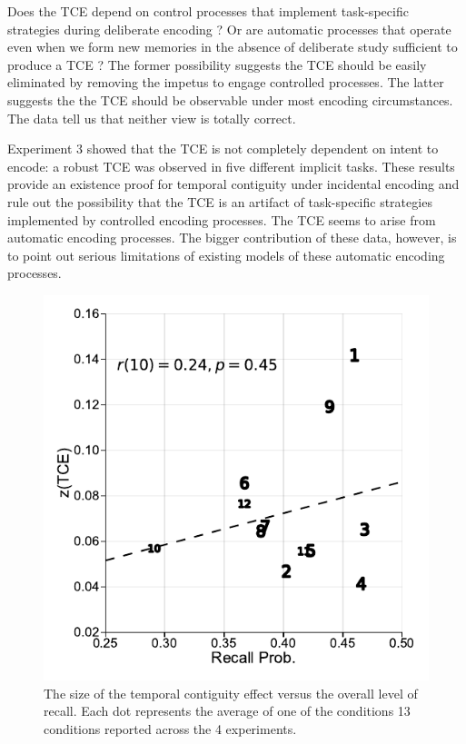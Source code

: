 \documentclass[man,natbib,floatsintext]{apa6} %
\begin{document}
\color{black}
Does the TCE depend on control processes that implement task-specific strategies during deliberate encoding \citep{Hint16}? Or are automatic processes that operate even when we form new memories in the absence of deliberate study sufficient to produce a TCE \citep{HealKaha17}? The former possibility suggests the TCE should be easily eliminated by removing the impetus to engage controlled processes. The latter suggests the the TCE should be observable under most encoding circumstances. The data tell us that neither view is totally correct.

Experiment 3 showed that the TCE is not completely dependent on intent to encode: a robust TCE was observed in five different implicit tasks. These results provide an existence proof for temporal contiguity under incidental encoding and rule out the possibility that the TCE is an artifact of task-specific strategies implemented by controlled encoding processes. The TCE seems to arise from automatic encoding processes. The bigger contribution of these data, however, is to point out serious limitations of existing models of these automatic encoding processes. 


\begin{figure}%
\includegraphics{figures/correlation.pdf}
\caption{The size of the temporal contiguity effect versus the overall level of recall. Each dot represents the average of one of the conditions 13 conditions reported across the 4 experiments.}
\label{corr}
\end{figure}
\end{document}
